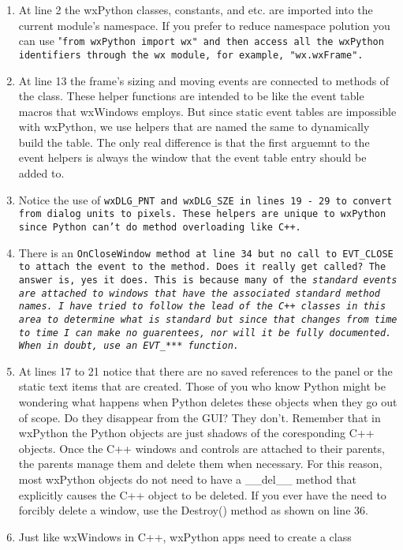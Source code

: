 \begin{enumerate}\itemsep=0pt
\item At line 2 the wxPython classes, constants, and etc. are imported
into the current module's namespace.  If you prefer to reduce
namespace polution you can use "\tt{from wxPython import wx}" and
then access all the wxPython identifiers through the wx module, for
example, "\tt{wx.wxFrame}".
\item At line 13 the frame's sizing and moving events are connected to
methods of the class.  These helper functions are intended to be like
the event table macros that wxWindows employs.  But since static event
tables are impossible with wxPython, we use helpers that are named the
same to dynamically build the table.  The only real difference is
that the first arguemnt to the event helpers is always the window that
the event table entry should be added to.
\item Notice the use of \tt{wxDLG\_PNT} and \tt{wxDLG\_SZE} in lines 19
- 29 to convert from dialog units to pixels.  These helpers are unique
to wxPython since Python can't do method overloading like C++.
\item There is an \tt{OnCloseWindow} method at line 34 but no call to
EVT\_CLOSE to attach the event to the method.  Does it really get
called?  The answer is, yes it does.  This is because many of the
\em{standard} events are attached to windows that have the associated
\em{standard} method names.  I have tried to follow the lead of the
C++ classes in this area to determine what is \em{standard} but since
that changes from time to time I can make no guarentees, nor will it
be fully documented.  When in doubt, use an EVT\_*** function.
\item At lines 17 to 21 notice that there are no saved references to
the panel or the static text items that are created.  Those of you
who know Python might be wondering what happens when Python deletes
these objects when they go out of scope.  Do they disappear from the GUI?  They
don't.  Remember that in wxPython the Python objects are just shadows of the
coresponding C++ objects.  Once the C++ windows and controls are
attached to their parents, the parents manage them and delete them
when necessary.  For this reason, most wxPython objects do not need to
have a \_\_del\_\_ method that explicitly causes the C++ object to be
deleted.  If you ever have the need to forcibly delete a window, use
the Destroy() method as shown on line 36.
\item Just like wxWindows in C++, wxPython apps need to create a class

\end{enumerate}
